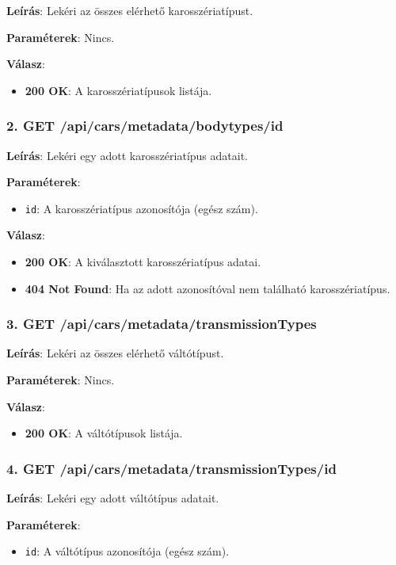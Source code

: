 \documentclass{report}[11pt]
\begin{document}
\textbf{Leírás}:  
Lekéri az összes elérhető karosszériatípust.

\textbf{Paraméterek}:  
Nincs.

\textbf{Válasz}:  
\begin{itemize}
    \item \textbf{200 OK}: A karosszériatípusok listája.
\end{itemize}

\subsubsection{2. GET /api/cars/metadata/bodytypes/{id}}

\textbf{Leírás}:  
Lekéri egy adott karosszériatípus adatait.

\textbf{Paraméterek}:  
\begin{itemize}
    \item \texttt{id}: A karosszériatípus azonosítója (egész szám).
\end{itemize}

\textbf{Válasz}:  
\begin{itemize}
    \item \textbf{200 OK}: A kiválasztott karosszériatípus adatai.
    \item \textbf{404 Not Found}: Ha az adott azonosítóval nem található karosszériatípus.
\end{itemize}

\subsubsection{3. GET /api/cars/metadata/transmissionTypes}

\textbf{Leírás}:  
Lekéri az összes elérhető váltótípust.

\textbf{Paraméterek}:  
Nincs.

\textbf{Válasz}:  
\begin{itemize}
    \item \textbf{200 OK}: A váltótípusok listája.
\end{itemize}

\subsubsection{4. GET /api/cars/metadata/transmissionTypes/{id}}

\textbf{Leírás}:  
Lekéri egy adott váltótípus adatait.

\textbf{Paraméterek}:  
\begin{itemize}
    \item \texttt{id}: A váltótípus azonosítója (egész szám).
\end{itemize}
\end{document}
